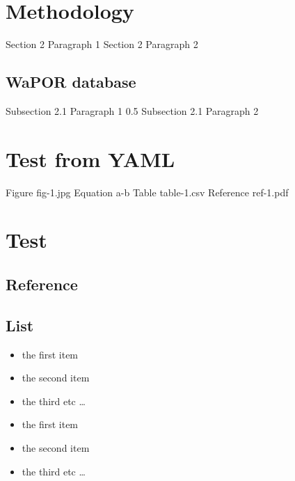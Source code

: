 \documentclass{article}%
\begin{document}
%
\newpage%
\RaggedRight%
\section{Methodology}%
\label{sec:Methodology}%
Section 2 Paragraph 1%
\linebreak%
Section 2 Paragraph 2%
\linebreak%
\subsection{WaPOR database}%
\label{subsec:WaPORdatabase}%
Subsection 2.1 Paragraph 1 0.5%
\linebreak%
Subsection 2.1 Paragraph 2%
\linebreak

%
\newpage%
\RaggedRight%
\section{Test from YAML}%
\label{sec:TestfromYAML}%
Figure fig{-}1.jpg%
\linebreak%
Equation a{-}b%
\linebreak%
Table table{-}1.csv%
\linebreak%
Reference ref{-}1.pdf%
\linebreak

%
\newpage%
\section{Test}%
\label{sec:Test}%
\subsection{Reference}%
\label{subsec:Reference}%
\cite{bertram}%
\linebreak%
\cite{simon06}%
\linebreak

%
\subsection{List}%
\label{subsec:List}%
\begin{itemize}%
\item%
the first item%
\item%
the second item%
\item%
the third etc%
\ldots%
\end{itemize}%
\begin{itemize}%
\item%
the first item%
\item%
the second item%
\item%
the third etc%
\ldots%
\end{itemize}
\end{document}
